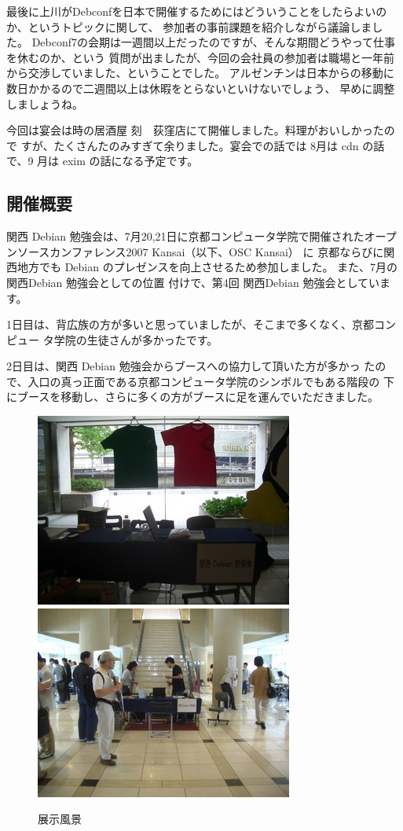 \documentclass[mingoth,a4paper]{jsarticle}
\begin{document}
最後に上川がDebconfを日本で開催するためにはどういうことをしたらよいのか、というトピックに関して、
参加者の事前課題を紹介しながら議論しました。
Debconf7の会期は一週間以上だったのですが、そんな期間どうやって仕事を休むのか、という
質問が出ましたが、今回の会社員の参加者は職場と一年前から交渉していました、ということでした。
アルゼンチンは日本からの移動に数日かかるので二週間以上は休暇をとらないといけないでしょう、
早めに調整しましょうね。

今回は宴会は時の居酒屋 刻　荻窪店にて開催しました。料理がおいしかったので
すが、たくさんたのみすぎて余りました。宴会での話では 8月は cdn の話で、9
月は exim の話になる予定です。

\label{sec:osckansai2007}

\subsection{開催概要}
関西 Debian 勉強会は、7月20,21日に京都コンピュータ学院で開催されたオープ
ンソースカンファレンス2007 Kansai（以下、OSC Kansai） に 京都ならびに関
西地方でも Debian のプレゼンスを向上させるため参加しました。
また、7月の関西Debian 勉強会としての位置
付けで、第4回 関西Debian 勉強会としています。

1日目は、背広族の方が多いと思っていましたが、そこまで多くなく、京都コンピュー
タ学院の生徒さんが多かったです。

2日目は、関西 Debian 勉強会からブースへの協力して頂いた方が多かっ
たので、入口の真っ正面である京都コンピュータ学院のシンボルでもある階段の
下にブースを移動し、さらに多くの方がブースに足を運んでいただきました。

\begin{figure}[H]
 \includegraphics[width=0.5\hsize]{image200708/0720booth.jpg}
 \includegraphics[width=0.5\hsize]{image200708/0721booth.jpg}
\caption{展示風景}
\label{fig:osctenjifukei}
\end{figure}
\end{document}
